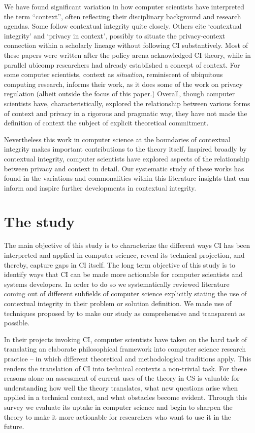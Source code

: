 \documentclass[../thesis.tex]{subfiles}
\begin{document}
We have found significant variation in how computer scientists have
interpreted the term ``context'',
often reflecting their disciplinary background and research agendas.
Some follow contextual integrity quite closely. Others cite
`contextual integrity' and
`privacy in context', possibly to
situate the privacy-context connection within a scholarly lineage
without following CI
substantively. Most of these
papers were written after the policy arena acknowledged CI theory,
while in parallel ubicomp researchers had already established a concept
of context. For some computer scientists, context as
\textit{situation}, reminiscent of ubiquitous computing research,
informs their work, as it does some of the work on privacy regulation
(albeit outside the focus of this paper.) Overall, though computer
scientists have, characteristically, explored the relationship between
various forms of context and privacy in a rigorous and pragmatic way,
they have not made the definition of context the subject of explicit
theoretical commitment.

Nevertheless this work in computer science at the boundaries of
contextual integrity makes important contributions to the theory
itself. Inspired broadly by contextual integrity, computer scientists
have explored aspects of the relationship between privacy and context
in detail. Our systematic study of these works has found in the
variations and commonalities within this literature insights that can
inform and inspire further developments in contextual integrity.

\section{The study}
\label{CI3}

The main objective of this study is to characterize the different ways
CI has been interpreted and applied in computer science, reveal its
technical projection, and thereby, capture gaps in CI itself. The long
term objective of this study is to identify ways that CI can be made
more actionable for computer scientists and systems developers. In
order to do so we systematically reviewed literature coming out of
different subfields of computer science explicitly stating the use of
contextual integrity in their problem or solution definition. We made
use of techniques proposed by \citet{kitchenham2007guidelines} to make our
study as comprehensive and transparent as possible. 

In their projects invoking CI, computer scientists have taken on the
hard task of translating an elaborate philosophical framework into
computer science research practice -- in which different theoretical
and methodological traditions apply.
This renders the translation of CI
into technical contexts a non-trivial task. For these reasons alone an
assessment of current uses of the theory in CS is valuable for
understanding how well the theory translates, what new questions arise
when applied in a technical context, and what obstacles become evident.
Through this survey we evaluate its uptake in computer science and
begin to sharpen the theory to make it more actionable for researchers
who want to use it in the future. 
\end{document}
